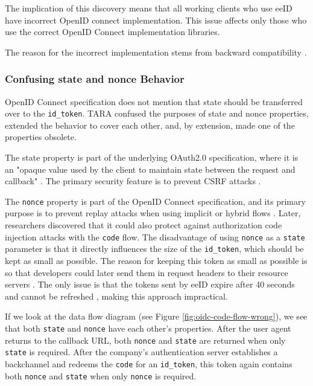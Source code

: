 The implication of this discovery means that all working clients who use eeID have incorrect OpenID connect implementation. This issue affects only those who use the correct OpenID Connect implementation libraries.

The reason for the incorrect implementation stems from backward compatibility \cite{tara-non-oidc-compliant}.

\subsubsection{Confusing state and nonce Behavior}

OpenID Connect specification does not mention that state should be transferred over to the \texttt{id\_token}. TARA confused the purposes of state and nonce properties, extended the behavior to cover each other, and, by extension, made one of the properties obsolete.

The state property is part of the underlying OAuth2.0 specification, where it is an "opaque value used by the client to maintain state between the request and callback" \cite{rfc6749}. The primary security feature is to prevent CSRF attacks \cite{rfc6749,ietf-oauth-security-topics-19}.

The \texttt{nonce} property is part of the OpenID Connect specification, and its primary purpose is to prevent replay attacks when using implicit or hybrid flows \cite{oidc}. Later, researchers discovered that it could also protect against authorization code injection attacks with the \texttt{code} flow. The disadvantage of using \texttt{nonce} as a \texttt{state} parameter is that it directly influences the size of the \texttt{id\_token}, which should be kept as small as possible. The reason for keeping this token as small as possible is so that developers could later send them in request headers to their resource servers \cite{rfc7519}. The only issue is that the tokens sent by eeID expire after 40 seconds and cannot be refreshed \cite{tara-technical}, making this approach impractical.

If we look at the data flow diagram (see Figure \ref{fig:oidc-code-flow-wrong}), we see that both \texttt{state} and \texttt{nonce} have each other's properties. After the user agent returns to the callback URL, both \texttt{nonce} and \texttt{state} are returned when only \texttt{state} is required. After the company's authentication server establishes a backchannel and redeems the \texttt{code} for an \texttt{id\_token}, this token again contains both \texttt{nonce} and \texttt{state} when only \texttt{nonce} is required.


